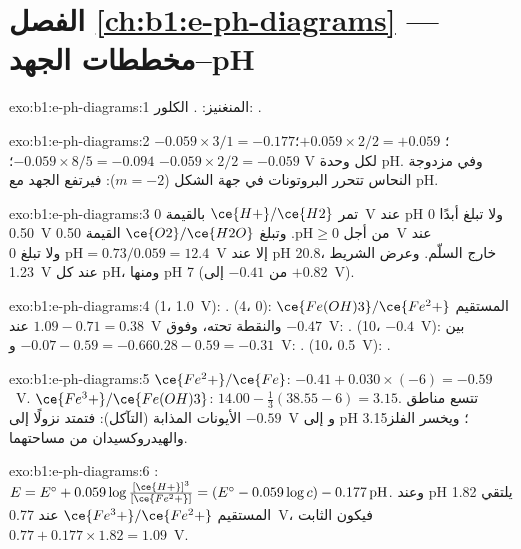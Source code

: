 \section*{الفصل \ref{ch:b1:e-ph-diagrams} --- مخططات الجهد--pH}

\begin{solution}{exo:b1:e-ph-diagrams:1}
المنغنيز: . الكلور: .
\end{solution}

\begin{solution}{exo:b1:e-ph-diagrams:2}
$-0.059 \times 3/1 = -0.177$؛ $+0.059 \times 2/2 = +0.059$؛
$-0.059 \times 8/5 = -0.094$؛ $-0.059 \times 2/2 = -0.059$ V لكل وحدة pH.
وفي مزدوجة النحاس تتحرر البروتونات في جهة الشكل
 ($m = -2$): فيرتفع الجهد مع pH.
\end{solution}

\begin{solution}{exo:b1:e-ph-diagrams:3}
تمر $\ce{H+}/\ce{H2}$ بالقيمة 0~V عند pH 0 ولا تبلغ أبدًا 0.50~V من أجل
$\mathrm{pH} \geqslant 0$. وتبلغ $\ce{O2}/\ce{H2O}$ القيمة 0.50~V عند
$\mathrm{pH} = 0.73/0.059 = 12.4$ ولا تبلغ 0~V إلا عند pH 20.8، خارج
السلّم. وعرض الشريط \qty{1.23}{V} عند كل pH، ومنها pH 7
(من $-0.41$ إلى $+0.82$~V).
\end{solution}

\begin{solution}{exo:b1:e-ph-diagrams:4}
(1، 1.0~V): . (4، 0): المستقيم $\ce{Fe(OH)3}/\ce{Fe^2+}$ عند
$1.09 - 0.71 = 0.38$~V والنقطة تحته، وفوق $-0.47$~V:
. (10، $-0.4$~V): بين $-0.07 - 0.59 = -0.66$ و$0.28 -
0.59 = -0.31$~V: . (10، 0.5~V): .
\end{solution}

\begin{solution}{exo:b1:e-ph-diagrams:5}
$\ce{Fe^2+}/\ce{Fe}$: $-0.41 + 0.030 \times (-6) = -0.59$~V.
$\ce{Fe^3+}/\ce{Fe(OH)3}$: $14.00 - \frac13(38.55 - 6) = 3.15$. تتسع مناطق
الأيونات المذابة (التآكل): فتمتد  نزولًا إلى $-0.59$~V
و إلى pH 3.15؛ ويخسر الفلز والهيدروكسيدان من مساحتهما.
\end{solution}

\begin{solution}{exo:b1:e-ph-diagrams:6}
: $E = E^\circ + 0.059\log\frac{[\ce{H+}]^3}{[\ce{Fe^2+}]}
= (E^\circ - 0.059\log c) - 0.177\,\mathrm{pH}$. وعند pH 1.82 يلتقي المستقيم
$\ce{Fe^3+}/\ce{Fe^2+}$ عند 0.77~V، فيكون الثابت $0.77 + 0.177 \times 1.82
= 1.09$~V.
\end{solution}


